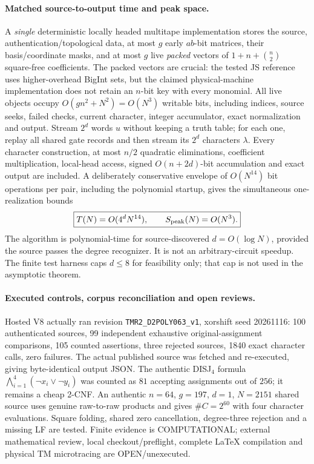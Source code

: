 \documentclass[11pt]{article}
\begin{document}
\paragraph{Matched source-to-output time and peak space.}
A \emph{single} deterministic locally headed multitape implementation
stores the source, authentication/topological data, at most $g$
early $ab$-bit matrices, their basis/coordinate masks, and at most
$g$ live \emph{packed} vectors of
$1+n+\binom n2$ square-free coefficients.  The packed vectors
are crucial: the tested JS reference uses higher-overhead BigInt
sets, but the claimed physical-machine implementation does not
retain an $n$-bit key with every monomial.
All live objects occupy $O(gn^2+N^2)=O(N^3)$ writable bits,
including indices, source seeks, failed checks, current character,
integer accumulator, exact normalization and output.
Stream $2^d$ words $u$ without keeping a truth table; for each one,
replay all shared gate records and then stream its $2^d$
characters $\lambda$.  Every character construction, at most $n/2$
quadratic eliminations, coefficient multiplication, local-head
access, signed $O(n+2d)$-bit accumulation and exact output are
included.  A deliberately conservative envelope of $O(N^{14})$
bit operations per pair, including the polynomial startup,
gives the simultaneous one-realization bounds
\[
\boxed{T(N)=O(4^dN^{14}),\qquad S_{\rm peak}(N)=O(N^3).}
\]
The algorithm is polynomial-time for source-discovered
$d=O(\log N)$, provided the source passes the degree recognizer.
It is not an arbitrary-circuit speedup.  The finite test harness
caps $d\le8$ for feasibility only; that cap is not used in the
asymptotic theorem.

\paragraph{Executed controls, corpus reconciliation and open reviews.}
Hosted V8 actually ran revision \texttt{TMR2\_D2POLY063\_v1},
xorshift seed 20261116: 100 authenticated sources, 99 independent
exhaustive original-assignment comparisons, 105 counted assertions,
three rejected sources, 1840 exact character calls, zero failures.
The actual published source was fetched and re-executed, giving
byte-identical output JSON.  The authentic DISJ$_4$ formula
$\bigwedge_{i=1}^4(\neg x_i\lor\neg y_i)$ was counted as $81$
accepting assignments out of $256$; it remains a cheap 2-CNF.
An authentic $n=64$, $g=197$, $d=1$, $N=2151$ shared source
uses genuine raw-to-raw products and gives $\#C=2^{60}$
with four character evaluations.
Square folding, shared zero cancellation, degree-three rejection
and a missing LF are tested.  Finite evidence is COMPUTATIONAL;
external mathematical review, local checkout/preflight, complete
LaTeX compilation and physical TM microtracing are OPEN/unexecuted.
\end{document}

